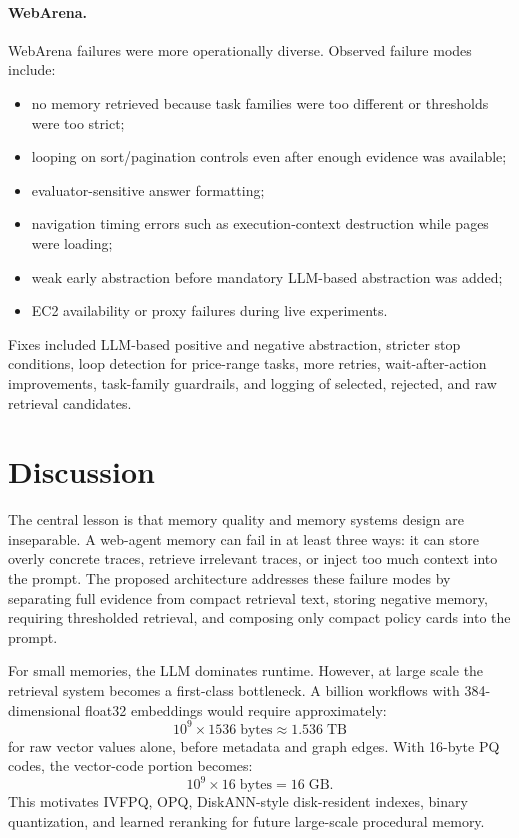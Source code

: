 \documentclass[11pt]{article}
\begin{document}
\paragraph{WebArena.}
WebArena failures were more operationally diverse. Observed failure modes include:
\begin{itemize}[leftmargin=*]
  \item no memory retrieved because task families were too different or thresholds were too strict;
  \item looping on sort/pagination controls even after enough evidence was available;
  \item evaluator-sensitive answer formatting;
  \item navigation timing errors such as execution-context destruction while pages were loading;
  \item weak early abstraction before mandatory LLM-based abstraction was added;
  \item EC2 availability or proxy failures during live experiments.
\end{itemize}
Fixes included LLM-based positive and negative abstraction, stricter stop conditions, loop detection for price-range tasks, more retries, wait-after-action improvements, task-family guardrails, and logging of selected, rejected, and raw retrieval candidates.

\section{Discussion}

The central lesson is that memory quality and memory systems design are inseparable. A web-agent memory can fail in at least three ways: it can store overly concrete traces, retrieve irrelevant traces, or inject too much context into the prompt. The proposed architecture addresses these failure modes by separating full evidence from compact retrieval text, storing negative memory, requiring thresholded retrieval, and composing only compact policy cards into the prompt.

For small memories, the LLM dominates runtime. However, at large scale the retrieval system becomes a first-class bottleneck. A billion workflows with 384-dimensional float32 embeddings would require approximately:
\begin{equation}
  10^9 \times 1536 \;\mathrm{bytes} \approx 1.536\;\mathrm{TB}
\end{equation}
for raw vector values alone, before metadata and graph edges. With 16-byte PQ codes, the vector-code portion becomes:
\begin{equation}
  10^9 \times 16 \;\mathrm{bytes} = 16\;\mathrm{GB}.
\end{equation}
This motivates IVFPQ, OPQ, DiskANN-style disk-resident indexes, binary quantization, and learned reranking for future large-scale procedural memory.
\end{document}
